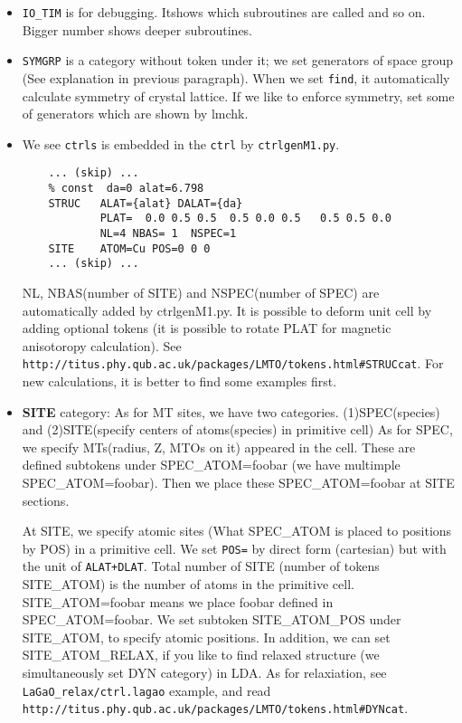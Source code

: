 \documentclass[a4paper,10pt,epsf,fleqn]{article}
\begin{document}
\begin{itemize}
\item
\verb+IO_TIM+ is for debugging. Itshows which subroutines are
called and so on. Bigger number shows deeper subroutines.

\item
\verb+SYMGRP+ is a category without token under it; 
we set generators of space group (See explanation in previous paragraph).
When we set \verb+find+, it automatically calculate symmetry of crystal lattice.
If we like to enforce symmetry, set some of generators which are shown by lmchk.

\item
We see \verb+ctrls+ is embedded in the \verb+ctrl+ by \verb+ctrlgenM1.py+.
\begin{verbatim}
    ... (skip) ...
    % const  da=0 alat=6.798
    STRUC   ALAT={alat} DALAT={da}
            PLAT=  0.0 0.5 0.5  0.5 0.0 0.5   0.5 0.5 0.0
            NL=4 NBAS= 1  NSPEC=1
    SITE    ATOM=Cu POS=0 0 0
    ... (skip) ...
\end{verbatim}
NL, NBAS(number of SITE) and NSPEC(number of SPEC) are automatically
added by ctrlgenM1.py.
It is possible to deform unit cell by adding optional tokens
(it is possible to rotate PLAT for magnetic anisotoropy calculation).
See \verb+http://titus.phy.qub.ac.uk/packages/LMTO/tokens.html#STRUCcat+.
For new calculations, it is better to find some examples first.

\item
{\bf SITE} category:
As for MT sites, we have two categories.
(1)SPEC(species) and (2)SITE(specify centers of atoms(species) in primitive cell)
As for SPEC, we specify MTs(radius, Z, MTOs on it) appeared in the cell.
These are defined subtokens under SPEC\_ATOM=foobar (we have multimple SPEC\_ATOM=foobar).
Then we place these SPEC\_ATOM=foobar at SITE sections.

At SITE, we specify atomic sites 
(What SPEC\_ATOM is placed to positions by POS) in a primitive cell.
We set \verb+POS=+ by direct form (cartesian) but with the unit of \verb$ALAT+DLAT$.
Total number of SITE (number of tokens SITE\_ATOM) is
the number of atoms in the primitive cell.
SITE\_ATOM=foobar means we place foobar defined in SPEC\_ATOM=foobar.
We set subtoken SITE\_ATOM\_POS under SITE\_ATOM, to specify atomic positions.
In addition, we can set SITE\_ATOM\_RELAX, if you like to find relaxed
structure (we simultaneously set DYN category) in LDA. As for
relaxiation, see \verb+LaGaO_relax/ctrl.lagao+
example, and read\\ \verb+http://titus.phy.qub.ac.uk/packages/LMTO/tokens.html#DYNcat+.\\


\end{itemize}
\end{document}
